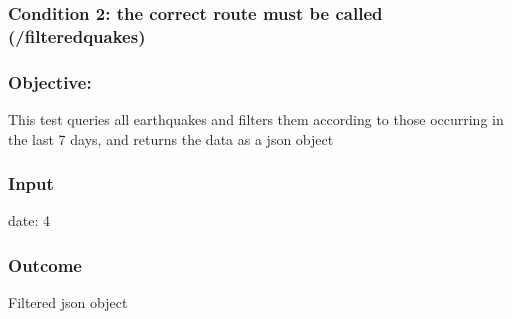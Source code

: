 \subsubsection{Condition 2: the correct route must be called (/filteredquakes)}
\subsubsection{Objective: } This test queries all earthquakes and filters them according to those occurring in the last 7 days, and returns the data as a json object
\subsubsection{Input}
{date: 4}
\subsubsection{Outcome}
Filtered json object